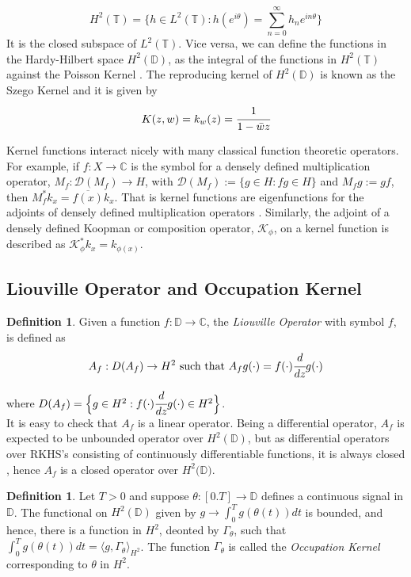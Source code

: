 \documentclass[preprint,12pt]{elsarticle} %
\theoremstyle{plain}
\theoremstyle{definition}
\newtheorem{definition}[theorem]{Definition}
\theoremstyle{remark}
\begin{document}
$$
H^2(\mathbb{T})= \bigg \{h\in L^2(\mathbb{T}): h(e^{i\theta})=\sum_{n=0}^{\infty} h_n e^{in\theta} \bigg\}
$$
It is the closed subspace of $L^2(\mathbb{T})$. Vice versa, we can define the functions in the Hardy-Hilbert space $H^2(\mathbb{D})$, as the integral of the functions in  $H^2(\mathbb{T})$ against the Poisson Kernel \cite{fricain2016theory}. The reproducing kernel of $H^2(\mathbb{D})$ is known as the Szego Kernel and it is given by 
$$
K(z,w)=k_w(z)=\cfrac{1}{1-\bar{w}z}
$$

Kernel functions interact nicely with many classical function theoretic operators. For example, if $f : X \to \mathbb{C}$ is the symbol for a densely defined multiplication operator, $M_f : \mathcal{D}(M_f) \to H$, with $\mathcal{D}(M_f) := \{ g \in H : fg \in H \}$ and $M_f g := gf$, then $M_f^* k_x = \overline{f(x)} k_x$. That is kernel functions are eigenfunctions for the adjoints of densely defined multiplication operators \cite{paulsen2016introduction}. Similarly, the adjoint of a densely defined Koopman or composition operator, $\mathcal{K}_\phi$, on a kernel function is described as $\mathcal{K}_\phi^* k_x = k_{\phi(x)}$.\\


\subsection{Liouville Operator and Occupation Kernel}
\begin{definition}
  Given a function $f:\mathbb{D}\rightarrow \mathbb{C}$, the \textit{Liouville Operator} with symbol $f$, is defined as $$A_f:D(A_f)\rightarrow H^2 \text{~such that~}A_f g(\cdot)=f(\cdot)\cfrac{d}{dz}g(\cdot)$$ 
\end{definition}
 where $D(A_f)=\Big\{g\in H^2:f(\cdot)\cfrac{d}{dz}g(\cdot)\in H^2\Big\}$.\\

 It is easy to check that $A_f$ is a linear operator. Being a differential operator, $A_f$ is expected to be unbounded operator over $H^2(\mathbb{D})$, but as differential operators over RKHS's consisting of continuously differentiable functions, it is always closed \cite{rosenfeld2024occupation}, hence $A_f$ is a closed operator over $H^2(\mathbb{D)}$. 

\begin{definition}
    Let $T>0$ and suppose $\theta :[0.T]\rightarrow \mathbb{D}$ defines a continuous signal in $\mathbb{D}$. The functional on $H^2(\mathbb{D})$ given by $g\rightarrow \int_{0}^{T}g(\theta(t))dt$ is bounded, and hence, there is a function in $H^2$, deonted by $\Gamma_{\theta}$, such that $\int_{0}^{T}g(\theta(t))dt=\langle g, \Gamma_{\theta}\rangle_{H^2}$. The function $\Gamma_{\theta}$ is called the \textit{Occupation Kernel} corresponding to $\theta$ in $H^2$. 
\end{definition}
\end{document}
